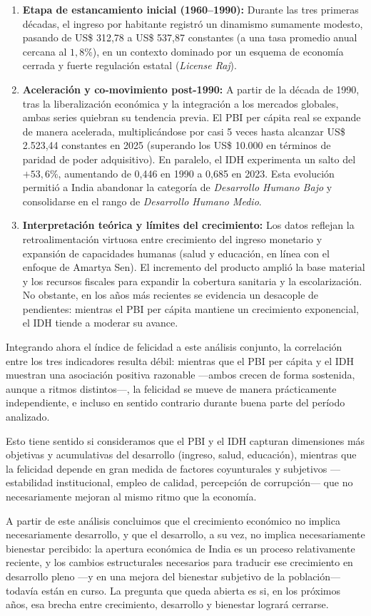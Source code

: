 \documentclass[11pt,a4paper]{article}
\begin{document}
\begin{enumerate}[leftmargin=1.5em]
    \item \textbf{Etapa de estancamiento inicial (1960--1990):} Durante las tres primeras décadas, el ingreso por habitante registró un dinamismo sumamente modesto, pasando de US\$ 312,78 a US\$ 537,87 constantes (a una tasa promedio anual cercana al $1,8\%$), en un contexto dominado por un esquema de economía cerrada y fuerte regulación estatal (\textit{License Raj}).
    \item \textbf{Aceleración y co-movimiento post-1990:} A partir de la década de 1990, tras la liberalización económica y la integración a los mercados globales, ambas series quiebran su tendencia previa. El PBI per cápita real se expande de manera acelerada, multiplicándose por casi 5 veces hasta alcanzar US\$ 2.523,44 constantes en 2025 (superando los US\$ 10.000 en términos de paridad de poder adquisitivo). En paralelo, el IDH experimenta un salto del $+53,6\%$, aumentando de 0,446 en 1990 a 0,685 en 2023. Esta evolución permitió a India abandonar la categoría de \textit{Desarrollo Humano Bajo} y consolidarse en el rango de \textit{Desarrollo Humano Medio}.
    \item \textbf{Interpretación teórica y límites del crecimiento:} Los datos reflejan la retroalimentación virtuosa entre crecimiento del ingreso monetario y expansión de capacidades humanas (salud y educación, en línea con el enfoque de Amartya Sen). El incremento del producto amplió la base material y los recursos fiscales para expandir la cobertura sanitaria y la escolarización. No obstante, en los años más recientes se evidencia un desacople de pendientes: mientras el PBI per cápita mantiene un crecimiento exponencial, el IDH tiende a moderar su avance.
\end{enumerate}

Integrando ahora el índice de felicidad a este análisis conjunto, la correlación entre los tres indicadores resulta débil: mientras que el PBI per cápita y el IDH muestran una asociación positiva razonable ---ambos crecen de forma sostenida, aunque a ritmos distintos---, la felicidad se mueve de manera prácticamente independiente, e incluso en sentido contrario durante buena parte del período analizado.

Esto tiene sentido si consideramos que el PBI y el IDH capturan dimensiones más objetivas y acumulativas del desarrollo (ingreso, salud, educación), mientras que la felicidad depende en gran medida de factores coyunturales y subjetivos ---estabilidad institucional, empleo de calidad, percepción de corrupción--- que no necesariamente mejoran al mismo ritmo que la economía.

A partir de este análisis concluimos que el crecimiento económico no implica necesariamente desarrollo, y que el desarrollo, a su vez, no implica necesariamente bienestar percibido: la apertura económica de India es un proceso relativamente reciente, y los cambios estructurales necesarios para traducir ese crecimiento en desarrollo pleno ---y en una mejora del bienestar subjetivo de la población--- todavía están en curso. La pregunta que queda abierta es si, en los próximos años, esa brecha entre crecimiento, desarrollo y bienestar logrará cerrarse.
\end{document}
